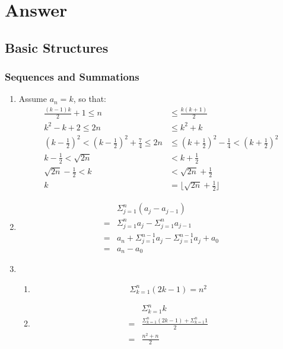 \documentclass{sig-alternate-05-2015}
\begin{document}
\nocite{*}

 
\clearpage
\appendix
\section{Answer}
\subsection{Basic Structures}
\subsubsection{Sequences and Summations}
\begin{enumerate}
\item Assume $a_n = k$, so that:
\begin{align}
	\frac{(k - 1)k}{2} + 1 \le n & \le \frac{k(k + 1)}{2}\\
	k^2 - k + 2 \le 2n & \le k^2 + k\\
	(k - \frac{1}{2})^2 < (k - \frac{1}{2})^2 + \frac{7}{4} \le 2n & \le (k + \frac{1}{2})^2 - \frac{1}{4} < (k + \frac{1}{2})^2\\
	k - \frac{1}{2} < \sqrt{2n} & < k + \frac{1}{2}\\
	\sqrt{2n} - \frac{1}{2} < k & < \sqrt{2n} + \frac{1}{2}\\
	k & = \lfloor \sqrt{2n} + \frac{1}{2} \rfloor
\end{align}

\item 
\begin{align}
	& \Sigma^n_{j = 1}(a_j - a_{j - 1})\\
	= & \Sigma^n_{j = 1}a_j - \Sigma^n_{j = 1}a_{j - 1}\\
	= & a_n + \Sigma^{n - 1}_{j = 1}a_j - \Sigma^{n - 1}_{j = 1}a_j + a_0\\
	= & a_n - a_0
\end{align}

\item 
\begin{enumerate}
	\item 
	\begin{equation}
		\Sigma^n_{k = 1}(2k - 1) = n^2
	\end{equation}
	
	\item 
	\begin{align}
		& \Sigma^n_{k = 1} k\\
		= & \frac{\Sigma^n_{k = 1}(2k - 1) + \Sigma^n_{k = 1} 1}{2}\\
		= & \frac{n^2 + n}{2}
	\end{align}
\end{enumerate}


\end{enumerate}
\end{document}
